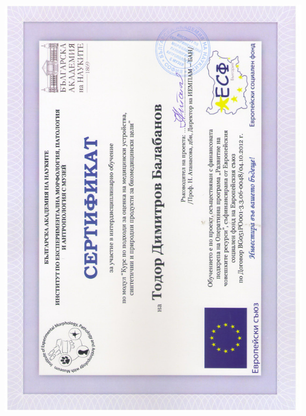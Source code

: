 \documentclass[bulgarian,a4paper]{europasscv}
\begin{document}
\includegraphics[width=\textwidth,height=\textheight,keepaspectratio]{IEMPAM2014_1}
\end{document}
